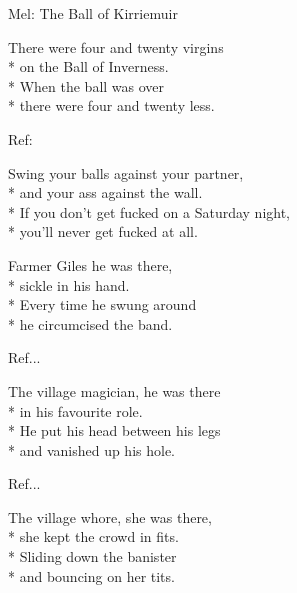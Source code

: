\begin{SongText}
    \begin{SongInfo}
        Mel: The Ball of Kirriemuir
    \end{SongInfo}
    \begin{SongVerse}
        There were four and twenty virgins\\*%
        on the Ball of Inverness.\\*%
        When the ball was over\\*%
        there were four and twenty less.
    \end{SongVerse}
    \begin{SongVerse}
        Ref:
    \end{SongVerse}
    \begin{SongVerse}
        Swing your balls against your partner,\\*%
        and your ass against the wall.\\*%
        If you don't get fucked on a Saturday night,\\*%
        you'll never get fucked at all.
    \end{SongVerse}
    \begin{SongVerse}
        Farmer Giles he was there,\\*%
        sickle in his hand.\\*%
        Every time he swung around\\*%
        he circumcised the band.
    \end{SongVerse}
    \begin{SongVerse}
        Ref...
    \end{SongVerse}
    \begin{SongVerse}
        The village magician, he was there\\*%
        in his favourite role.\\*%
        He put his head between his legs\\*%
        and vanished up his hole.
    \end{SongVerse}
    \begin{SongVerse}
        Ref...
    \end{SongVerse}
    \begin{SongVerse}
        The village whore, she was there,\\*%
        she kept the crowd in fits.\\*%
        Sliding down the banister\\*%
        and bouncing on her tits.

\end{SongVerse}
\end{SongText}
